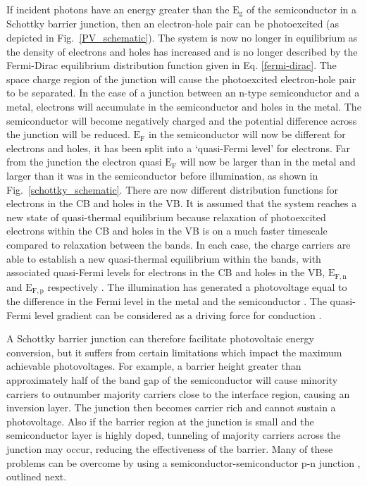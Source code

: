 \documentclass[11pt, twoside]{report}
\begin{document}
If incident photons have an energy greater than the $\mathrm{E_g}$ of the semiconductor in a Schottky barrier junction, then an electron-hole pair can be photoexcited (as depicted in Fig.~\ref{PV_schematic}). The system is now no longer in equilibrium as the density of electrons and holes has increased and is no longer described by the Fermi-Dirac equilibrium distribution function given in Eq. \ref{fermi-dirac}. 
The space charge region of the junction will cause the photoexcited electron-hole pair to be separated. In the case of a junction between an n-type semiconductor and a metal, electrons will accumulate in the semiconductor and holes in the metal. The semiconductor will become negatively charged and the potential difference across the junction will be reduced. $\mathrm{E_F}$ in the semiconductor will now be different for electrons and holes, it has been split into a `quasi-Fermi level' for electrons. Far from the junction the electron quasi $\mathrm{E_F}$ will now be larger than in the metal and larger than it was in the semiconductor before illumination, as shown in Fig.~\ref{schottky_schematic}.
There are now different distribution functions for electrons in the CB and holes in the VB. It is assumed that the system reaches a new state of quasi-thermal equilibrium because relaxation of photoexcited electrons within the CB and holes in the VB is on a much faster timescale compared to relaxation between the bands. In each case, the charge carriers are able to establish a new quasi-thermal equilibrium within the bands, with associated quasi-Fermi levels for electrons in the CB and holes in the VB, $\mathrm{E_{F,n}}$ and $\mathrm{E_{F,p}}$ respectively
\cite{Nelson3}.
 The illumination has generated a photovoltage equal to the difference in the Fermi level in the metal and the semiconductor \cite{Nelson5}. The quasi-Fermi level gradient can be considered as a driving force for conduction \cite{Nelson3}.

A Schottky barrier junction can therefore facilitate photovoltaic energy conversion, but it suffers from certain limitations which impact the maximum achievable photovoltages. For example, a barrier height greater than approximately half of the band gap of the semiconductor will cause minority carriers to outnumber majority carriers close to the interface region, causing an inversion layer. The junction then becomes carrier rich and cannot sustain a photovoltage. Also if the barrier region at the junction is small and the semiconductor layer is highly doped, tunneling of majority carriers across the junction may occur, reducing the effectiveness of the barrier. Many of these problems can be overcome by using a semiconductor-semiconductor p-n junction \cite{Nelson5}, outlined next.
\end{document}
